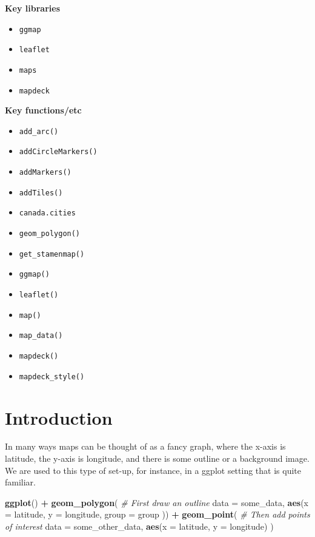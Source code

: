 \documentclass[
]{book}
\newenvironment{Shaded}{\begin{snugshade}}{\end{snugshade}}
\newcommand{\CommentTok}[1]{\textcolor[rgb]{0.56,0.35,0.01}{\textit{#1}}}
\newcommand{\DataTypeTok}[1]{\textcolor[rgb]{0.13,0.29,0.53}{#1}}
\newcommand{\KeywordTok}[1]{\textcolor[rgb]{0.13,0.29,0.53}{\textbf{#1}}}
\newcommand{\NormalTok}[1]{#1}
\newcommand{\OperatorTok}[1]{\textcolor[rgb]{0.81,0.36,0.00}{\textbf{#1}}}
\newcommand{\StringTok}[1]{\textcolor[rgb]{0.31,0.60,0.02}{#1}}
\providecommand{\tightlist}{%
  \setlength{\itemsep}{0pt}\setlength{\parskip}{0pt}}
\begin{document}
\textbf{Key libraries}

\begin{itemize}
\tightlist
\item
  \texttt{ggmap}
\item
  \texttt{leaflet}
\item
  \texttt{maps}
\item
  \texttt{mapdeck}
\end{itemize}

\textbf{Key functions/etc}

\begin{itemize}
\tightlist
\item
  \texttt{add\_arc()}
\item
  \texttt{addCircleMarkers()}
\item
  \texttt{addMarkers()}
\item
  \texttt{addTiles()}
\item
  \texttt{canada.cities}
\item
  \texttt{geom\_polygon()}
\item
  \texttt{get\_stamenmap()}
\item
  \texttt{ggmap()}
\item
  \texttt{leaflet()}
\item
  \texttt{map()}
\item
  \texttt{map\_data()}
\item
  \texttt{mapdeck()}
\item
  \texttt{mapdeck\_style()}
\end{itemize}

\hypertarget{introduction-5}{%
\section{Introduction}\label{introduction-5}}

In many ways maps can be thought of as a fancy graph, where the x-axis is latitude, the y-axis is longitude, and there is some outline or a background image. We are used to this type of set-up, for instance, in a ggplot setting that is quite familiar.

\begin{Shaded}
\begin{Highlighting}[]
\KeywordTok{ggplot}\NormalTok{() }\OperatorTok{+}
\StringTok{  }\KeywordTok{geom_polygon}\NormalTok{( }\CommentTok{# First draw an outline}
    \DataTypeTok{data =}\NormalTok{ some_data, }
    \KeywordTok{aes}\NormalTok{(}\DataTypeTok{x =}\NormalTok{ latitude, }
        \DataTypeTok{y =}\NormalTok{ longitude,}
        \DataTypeTok{group =}\NormalTok{ group}
\NormalTok{        )) }\OperatorTok{+}
\StringTok{  }\KeywordTok{geom_point}\NormalTok{( }\CommentTok{# Then add points of interest}
    \DataTypeTok{data =}\NormalTok{ some_other_data, }
    \KeywordTok{aes}\NormalTok{(}\DataTypeTok{x =}\NormalTok{ latitude, }
        \DataTypeTok{y =}\NormalTok{ longitude)}
\NormalTok{    )}
\end{Highlighting}
\end{Shaded}
\end{document}
